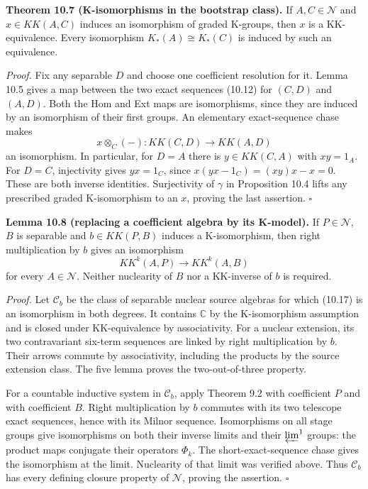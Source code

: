 \documentclass[
  11pt,
]{article}
\begin{document}
\textbf{Theorem 10.7 (K-isomorphisms in the bootstrap class).} If
\(A,C\in\mathcal N\) and \(x\in KK(A,C)\) induces an isomorphism of
graded K-groups, then \(x\) is a KK-equivalence. Every isomorphism
\(K_*(A)\cong K_*(C)\) is induced by such an equivalence.

\emph{Proof.} Fix any separable \(D\) and choose one coefficient
resolution for it. Lemma 10.5 gives a map between the two exact
sequences (10.12) for \((C,D)\) and \((A,D)\). Both the Hom and Ext maps
are isomorphisms, since they are induced by an isomorphism of their
first groups. An elementary exact-sequence chase makes \[
x\otimes_C(-):KK(C,D)\longrightarrow KK(A,D)
\tag{10.16}
\] an isomorphism. In particular, for \(D=A\) there is \(y\in KK(C,A)\)
with \(xy=1_A\). For \(D=C\), injectivity gives \(yx=1_C\), since
\(x(yx-1_C)=(xy)x-x=0\). These are both inverse identities. Surjectivity
of \(\gamma\) in Proposition 10.4 lifts any prescribed graded
K-isomorphism to an \(x\), proving the last assertion. \(\square\)

\textbf{Lemma 10.8 (replacing a coefficient algebra by its K-model).} If
\(P\in\mathcal N\), \(B\) is separable and \(b\in KK(P,B)\) induces a
K-isomorphism, then right multiplication by \(b\) gives an isomorphism
\[
KK^k(A,P)\longrightarrow KK^k(A,B)
\tag{10.17}
\] for every \(A\in\mathcal N\). Neither nuclearity of \(B\) nor a
KK-inverse of \(b\) is required.

\emph{Proof.} Let \(\mathcal C_b\) be the class of separable nuclear
source algebras for which (10.17) is an isomorphism in both degrees. It
contains \(\mathbb C\) by the K-isomorphism assumption and is closed
under KK-equivalence by associativity. For a nuclear extension, its two
contravariant six-term sequences are linked by right multiplication by
\(b\). Their arrows commute by associativity, including the products by
the source extension class. The five lemma proves the two-out-of-three
property.

For a countable inductive system in \(\mathcal C_b\), apply Theorem 9.2
with coefficient \(P\) and with coefficient \(B\). Right multiplication
by \(b\) commutes with its two telescope exact sequences, hence with its
Milnor sequence. Isomorphisms on all stage groups give isomorphisms on
both their inverse limits and their \(\varprojlim^1\) groups: the
product maps conjugate their operators \(\Phi_k\). The
short-exact-sequence chase gives the isomorphism at the limit.
Nuclearity of that limit was verified above. Thus \(\mathcal C_b\) has
every defining closure property of \(\mathcal N\), proving the
assertion. \(\square\)
\end{document}
